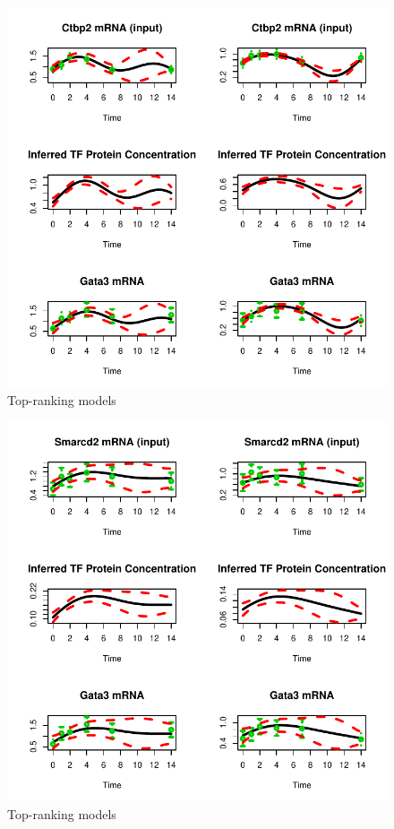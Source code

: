 \documentclass{article}
\begin{document}
\begin{figure}[htb]
  \centering
  \includegraphics[width=\columnwidth]{gpdisim_Ctbp2_Gata3}
  \caption{Top-ranking models}
  \label{fig:model3}
\end{figure}

\begin{figure}[htb]
  \centering
  \includegraphics[width=\columnwidth]{gpdisim_Smarcd2_Gata3}
  \caption{Top-ranking models}
  \label{fig:model5}
\end{figure}
\end{document}

